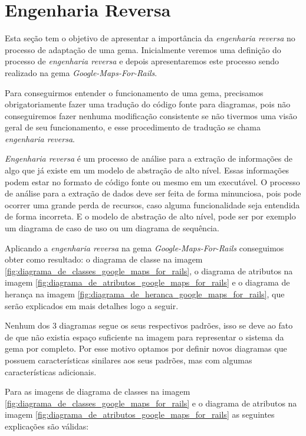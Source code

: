 \section{Engenharia Reversa}
\label{section:engenharia_reversa}

Esta seção tem o objetivo de apresentar a importância da \emph{engenharia reversa} no processo de adaptação
de uma gema. Inicialmente veremos uma definição do processo de \emph{engenharia reversa} e depois
apresentaremos este processo sendo realizado na gema \emph{Google-Maps-For-Rails}.

Para conseguirmos entender o funcionamento de uma gema, precisamos obrigatoriamente fazer uma tradução
do código fonte para diagramas, pois não conseguiremos fazer nenhuma modificação consistente
se não tivermos uma visão geral de seu funcionamento, e esse procedimento de tradução se chama 
\emph{engenharia reversa}.

\emph{Engenharia reversa} é um processo de análise para a extração de informações de algo que já 
existe em um modelo de abstração de alto nível. Essas informações podem estar no formato de código 
fonte ou mesmo em um executável. O processo de análise para a extração de dados deve ser feita de forma
minunciosa, pois pode ocorrer uma grande perda de recursos, caso alguma funcionalidade seja entendida de
forma incorreta. E o modelo de abstração de alto nível, pode ser por exemplo um diagrama de caso de uso ou
um diagrama de sequência.

Aplicando a \emph{engenharia reversa} na gema \emph{Google-Maps-For-Rails} conseguimos obter como resultado:
o diagrama de classe na imagem \ref{fig:diagrama_de_classes_google_maps_for_rails}, o diagrama de
atributos na imagem \ref{fig:diagrama_de_atributos_google_maps_for_rails} e o diagrama de herança na
imagem \ref{fig:diagrama_de_heranca_google_maps_for_rails}, que serão explicados em mais detalhes logo a
seguir.

Nenhum dos 3 diagramas segue os seus respectivos padrões, isso se deve ao fato de que não existia espaço 
suficiente na imagem para representar o sistema da gema por completo. Por esse motivo optamos por definir 
novos diagramas que possuem características sinilares aos seus padrões, mas com algumas características
adicionais.

Para as imagens de diagrama de classes na imagem \ref{fig:diagrama_de_classes_google_maps_for_rails} e
o diagrama de atributos na imagem \ref{fig:diagrama_de_atributos_google_maps_for_rails} as seguintes
explicações são válidas:

